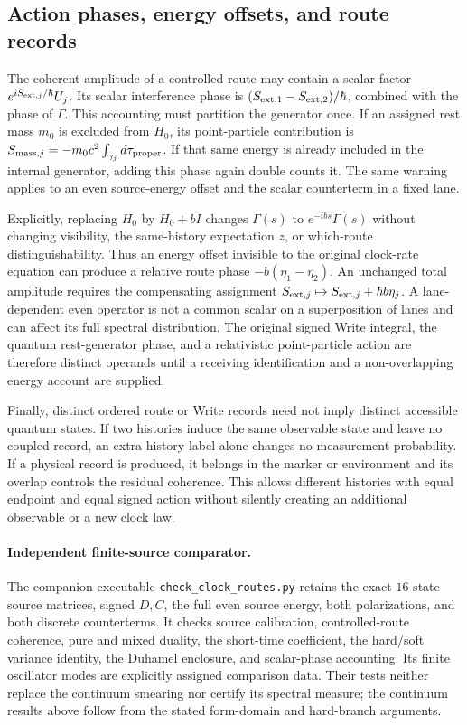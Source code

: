 \subsection{Action phases, energy offsets, and route records}
\label{sec:ch6-route-phase-account}
The coherent amplitude of a controlled route may contain a scalar factor
$e^{iS_{{\rm ext},j}/\hbar}U_j$. Its scalar interference phase is
$(S_{{\rm ext},1}-S_{{\rm ext},2})/\hbar$, combined with the phase of
$\Gamma$. This accounting must partition the generator once. If an assigned
rest mass $m_0$ is excluded from $H_0$, its point-particle contribution is
$S_{{\rm mass},j}=-m_0c^2\int_{\gamma_j}d\tau_{\rm proper}$.
If that same energy is already included in the internal generator, adding
this phase again double counts it. The same warning applies to an even
source-energy offset and the scalar counterterm in a fixed lane.

Explicitly, replacing $H_0$ by $H_0+bI$ changes
$\Gamma(s)$ to $e^{-ibs}\Gamma(s)$ without changing visibility, the
same-history expectation $z$, or which-route distinguishability. Thus an
energy offset invisible to the original clock-rate equation can produce a
relative route phase $-b(\eta_1-\eta_2)$. An unchanged total amplitude requires the
compensating assignment
$S_{{\rm ext},j}\mapsto S_{{\rm ext},j}+\hbar b\eta_j$.
A lane-dependent even operator is not a common scalar on a superposition of
lanes and can affect its full spectral distribution. The original signed
Write integral, the quantum rest-generator phase, and a relativistic
point-particle action are therefore distinct operands until a receiving
identification and a non-overlapping energy account are supplied.

Finally, distinct ordered route or Write records need not imply distinct
accessible quantum states. If two histories induce the same observable
state and leave no coupled record, an extra history label alone changes no
measurement probability. If a physical record is produced, it belongs in
the marker or environment and its overlap controls the residual coherence.
This allows different histories with equal endpoint and equal signed action
without silently creating an additional observable or a new clock law.

\paragraph{Independent finite-source comparator.}
The companion executable \texttt{check\_clock\_routes.py} retains the exact
$16$-state source matrices, signed $D,C$, the full even source energy, both
polarizations, and both discrete counterterms. It checks source calibration,
controlled-route coherence, pure and mixed duality, the short-time
coefficient, the hard/soft variance identity, the Duhamel enclosure, and
scalar-phase accounting. Its finite oscillator modes are explicitly assigned
comparison data. Their tests neither replace the continuum smearing nor
certify its spectral measure; the continuum results above follow from the
stated form-domain and hard-branch arguments.

